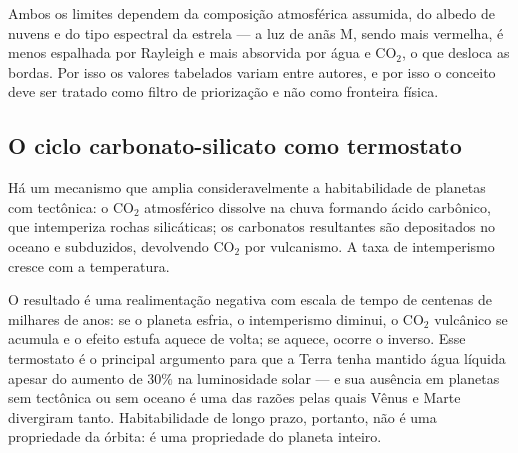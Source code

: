 \documentclass[11pt,a4paper]{article}
\begin{document}
Ambos os limites dependem da composição atmosférica assumida, do albedo de nuvens e do tipo espectral da estrela --- a luz de anãs M, sendo mais vermelha, é menos espalhada por Rayleigh e mais absorvida por água e CO$_2$, o que desloca as bordas. Por isso os valores tabelados variam entre autores, e por isso o conceito deve ser tratado como filtro de priorização e não como fronteira física.

\subsection*{O ciclo carbonato-silicato como termostato}

Há um mecanismo que amplia consideravelmente a habitabilidade de planetas com tectônica: o CO$_2$ atmosférico dissolve na chuva formando ácido carbônico, que intemperiza rochas silicáticas; os carbonatos resultantes são depositados no oceano e subduzidos, devolvendo CO$_2$ por vulcanismo. A taxa de intemperismo cresce com a temperatura.

O resultado é uma realimentação negativa com escala de tempo de centenas de milhares de anos: se o planeta esfria, o intemperismo diminui, o CO$_2$ vulcânico se acumula e o efeito estufa aquece de volta; se aquece, ocorre o inverso. Esse termostato é o principal argumento para que a Terra tenha mantido água líquida apesar do aumento de $30\%$ na luminosidade solar --- e sua ausência em planetas sem tectônica ou sem oceano é uma das razões pelas quais Vênus e Marte divergiram tanto. Habitabilidade de longo prazo, portanto, não é uma propriedade da órbita: é uma propriedade do planeta inteiro.
\end{document}

